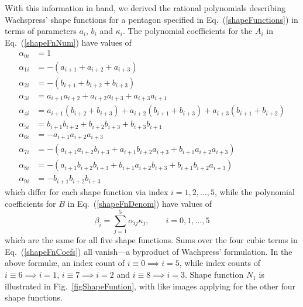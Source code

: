 With this information in hand, we derived the rational polynomials describing Wachspress' shape functions for a pentagon specified in Eq.~(\ref{shapeFunctions}) in terms of parameters $a_i$, $b_i$ and $\kappa_i$.  The polynomial coefficients for the $A_i$ in Eq.~(\ref{shapeFnNum}) have values of
\begin{subequations}
	\label{shapeFnCoefs}
	\begin{align}
	\alpha_{0i} & = 1 \\
	\alpha_{1i} & = -( a_{i+1} + a_{i+2} + a_{i+3} ) \\
	\alpha_{2i} & = -( b_{i+1} + b_{i+2} + b_{i+3} ) \\
	\alpha_{3i} & = a_{i+1} a_{i+2} + a_{i+2} a_{i+3} + a_{i+3} a_{i+1} \\
	\alpha_{4i} & = a_{i+1} ( b_{i+2} + b_{i+3} ) + a_{i+2} ( b_{i+1} + 
	b_{i+3} ) + a_{i+3} ( b_{i+1} + b_{i+2} ) \\
	\alpha_{5i} & = b_{i+1} b_{i+2} + b_{i+2} b_{i+3} + b_{i+3} b_{i+1} \\
	\alpha_{6i} & = -a_{i+1} a_{i+2} a_{i+3} \\
	\alpha_{7i} & = -( a_{i+1} a_{i+2} b_{i+3} + a_{i+1} b_{i+2} a_{i+3} + 
	b_{i+1} a_{i+2} a_{i+3} ) \\
	\alpha_{8i} & = -( a_{i+1} b_{i+2} b_{i+3} + b_{i+1} a_{i+2} b_{i+3} + 
	b_{i+1} b_{i+2} a_{i+3} ) \\
	\alpha_{9i} & = -b_{i+1} b_{i+2} b_{i+3}
	\end{align}
\end{subequations}
which differ for each shape function via index $i = 1,2,\dots,5$, while the polynomial coefficients for $B$ in Eq.~(\ref{shapeFnDenom}) have values of
\begin{equation}
\beta_i = \sum_{j=1}^5 \alpha_{ij} \kappa_j, \qquad i = 0, 1, \dots, 5
\end{equation}
which are the same for all five shape functions.  Sums over the four cubic terms in Eq.~(\ref{shapeFnCoefs}) all vanish---a byproduct of Wachpress' formulation.  In the above formul\ae, an index count of $i \equiv 0 \implies i = 5$, while index counts of $i \equiv 6 \implies i = 1$, $i \equiv 7 \implies i = 2$ and $i \equiv 8 \implies i = 3$.  Shape function $N_1$ is illustrated in Fig.~\ref{figShapeFuntion}, with like images applying for the other four shape functions.

